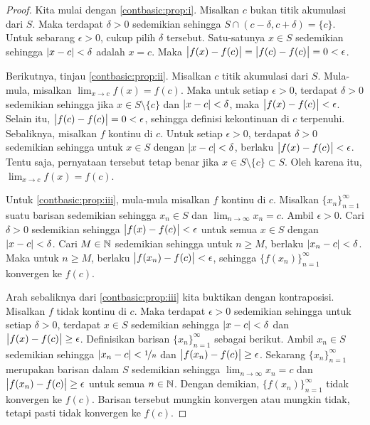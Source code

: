 \begin{proof}
\pagebreak[2]
Kita mulai dengan \ref{contbasic:prop:i}.  Misalkan $c$ bukan titik akumulasi dari
$S$.  Maka terdapat $\delta > 0$
sedemikian sehingga $S \cap (c-\delta,c+\delta) = \{ c \}$.
Untuk sebarang $\epsilon > 0$, cukup pilih $\delta$ tersebut.
Satu-satunya $x \in S$ sedemikian sehingga $\lvert {x-c} \rvert < \delta$ adalah $x=c$.  Maka
$\bigl\lvert {f(x)-f(c)} \bigr\rvert = \bigl\lvert {f(c)-f(c)} \bigr\rvert = 0 < \epsilon$.

Berikutnya, tinjau \ref{contbasic:prop:ii}.
Misalkan $c$ titik akumulasi dari $S$.  Mula-mula, misalkan
$\lim_{x\to c} f(x) = f(c)$.  Maka untuk setiap $\epsilon > 0$,
terdapat $\delta > 0$ sedemikian sehingga jika $x \in S \setminus \{ c \}$
dan $\lvert {x-c} \rvert < \delta$, maka $\bigl\lvert {f(x)-f(c)} \bigr\rvert < \epsilon$.
Selain itu, $\bigl\lvert {f(c)-f(c)} \bigr\rvert = 0 < \epsilon$, sehingga definisi kekontinuan di
$c$ terpenuhi.  Sebaliknya, misalkan $f$ kontinu
di $c$.  Untuk setiap $\epsilon > 0$, terdapat $\delta > 0$
sedemikian sehingga untuk $x \in S$ dengan $\lvert {x-c} \rvert < \delta$, berlaku
$\bigl\lvert {f(x)-f(c)} \bigr\rvert < \epsilon$.  Tentu saja, pernyataan tersebut tetap benar jika
$x \in S \setminus \{ c \} \subset S$.  Oleh karena itu, $\lim_{x\to c} f(x) =
f(c)$.

Untuk \ref{contbasic:prop:iii}, mula-mula misalkan $f$ kontinu di $c$.
Misalkan $\{ x_n \}_{n=1}^\infty$
suatu barisan sedemikian sehingga $x_n \in S$ dan $\lim_{n\to\infty} x_n = c$.  Ambil $\epsilon > 0$.
Cari $\delta > 0$ sedemikian sehingga $\bigl\lvert {f(x)-f(c)} \bigr\rvert < \epsilon$
untuk semua $x \in S$ dengan $\lvert {x-c} \rvert < \delta$.  Cari $M \in {\mathbb{N}}$
sedemikian sehingga untuk $n \geq M$, berlaku $\lvert {x_n-c} \rvert < \delta$.  Maka untuk
$n \geq M$, berlaku $\bigl\lvert {f(x_n)-f(c)} \bigr\rvert < \epsilon$,
sehingga $\bigl\{ f(x_n) \bigr\}_{n=1}^\infty$
konvergen ke $f(c)$.

Arah sebaliknya dari \ref{contbasic:prop:iii} kita buktikan dengan kontraposisi.
Misalkan $f$ tidak
kontinu di $c$.  Maka terdapat $\epsilon > 0$
sedemikian sehingga untuk setiap $\delta > 0$, terdapat $x \in S$
sedemikian sehingga $\lvert {x-c} \rvert < \delta$ dan $\bigl\lvert {f(x)-f(c)} \bigr\rvert \geq \epsilon$.
Definisikan barisan $\{ x_n \}_{n=1}^\infty$ sebagai berikut.
Ambil $x_n \in S$ sedemikian sehingga $\lvert {x_n-c} \rvert < \nicefrac{1}{n}$
dan $\bigl\lvert {f(x_n)-f(c)} \bigr\rvert \geq \epsilon$.
Sekarang $\{ x_n \}_{n=1}^\infty$ merupakan
barisan dalam $S$ sedemikian sehingga
$\lim_{n\to\infty} x_n = c$ dan
$\bigl\lvert {f(x_n)-f(c)} \bigr\rvert \geq \epsilon$ untuk semua $n \in {\mathbb{N}}$.
Dengan demikian, $\bigl\{ f(x_n) \bigr\}_{n=1}^\infty$
tidak konvergen ke $f(c)$.  Barisan tersebut mungkin konvergen atau mungkin tidak, tetapi pasti
tidak konvergen ke $f(c)$.
\end{proof}

